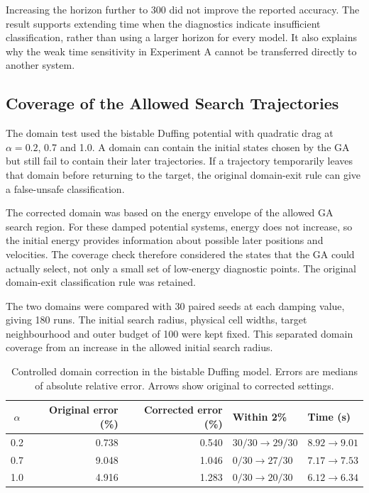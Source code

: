 
Increasing the horizon further to 300 did not improve the reported accuracy. The result supports extending time when the diagnostics indicate insufficient classification, rather than using a larger horizon for every model. It also explains why the weak time sensitivity in Experiment A cannot be transferred directly to another system.

\subsection{Coverage of the Allowed Search Trajectories}

The domain test used the bistable Duffing potential with quadratic drag at $\alpha=0.2$, 0.7 and 1.0. A domain can contain the initial states chosen by the GA but still fail to contain their later trajectories. If a trajectory temporarily leaves that domain before returning to the target, the original domain-exit rule can give a false-unsafe classification.

The corrected domain was based on the energy envelope of the allowed GA search region. For these damped potential systems, energy does not increase, so the initial energy provides information about possible later positions and velocities. The coverage check therefore considered the states that the GA could actually select, not only a small set of low-energy diagnostic points. The original domain-exit classification rule was retained.

The two domains were compared with 30 paired seeds at each damping value, giving 180 runs. The initial search radius, physical cell widths, target neighbourhood and outer budget of 100 were kept fixed. This separated domain coverage from an increase in the allowed initial search radius.

\begin{table}[tbp]
\centering\small
\caption[Controlled domain correction]{Controlled domain correction in the bistable Duffing model. Errors are medians of absolute relative error. Arrows show original to corrected settings.}
\label{tab:c-domain}
\begin{tabularx}{\linewidth}{@{}c r r Y l@{}}
\toprule
$\alpha$ & Original error (\%) & Corrected error (\%) & Within 2\% & Time (s) \\
 & 0.738 & 0.540 & $30/30\to29/30$ & $8.92\to9.01$ \\
0.7 & 9.048 & 1.046 & $0/30\to27/30$ & $7.17\to7.53$ \\
1.0 & 4.916 & 1.283 & $0/30\to20/30$ & $6.12\to6.34$ \\
\bottomrule
\end{tabularx}
\end{table}

